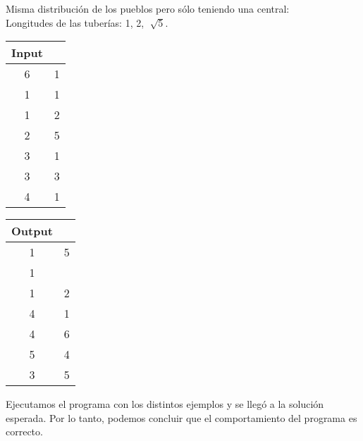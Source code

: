 \documentclass[11pt, a4paper, twoside]{article}
\begin{document}
\begin{itemize}
\begin{itemize}
				Misma distribución de los pueblos pero sólo teniendo una central: \\
				Longitudes de las tuberías: 1, 2, $\sqrt[] {5}$. \\
				   \begin{minipage}{0.2\textwidth}
						\begin{tabular}{cc}
						   Input \\
						   \hline
						   6 & 1 \\
						   1 & 1 \\
						   1 & 2 \\
						   2 & 5 \\
						   3 & 1 \\
						   3 & 3 \\
						   4 & 1 \\
						\end{tabular}
				   \end{minipage} 
				   \begin{minipage}{0.2\textwidth}
						\begin{tabular}{cc}
						   Output \\
						   \hline
						   1 & 5 \\
						   1 &   \\
						   1 & 2 \\
						   4 & 1 \\
						   4 & 6 \\
						   5 & 4 \\
						   3 & 5 \\
						\end{tabular}
				   \end{minipage} 
			\end{itemize}
		
\end{itemize}

Ejecutamos el programa con los distintos ejemplos y se llegó a la solución esperada. 
Por lo tanto, podemos concluir que el comportamiento del programa es correcto. 
\end{document}
